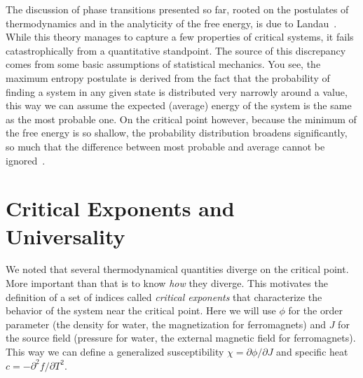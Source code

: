The discussion of phase transitions presented so far, rooted on the postulates
of thermodynamics and in the analyticity of the free energy, is due to
Landau~\cite{Landau1969}. While this theory manages to capture a few properties
of critical systems, it fails catastrophically from a quantitative standpoint.
The source of this discrepancy comes from some basic assumptions of statistical
mechanics. You see, the maximum entropy postulate is derived from the fact that
the probability of finding a system in any given state is distributed very
narrowly around a value, this way we can assume the expected (average) energy
of the system is the same as the most probable one. On the critical point
however, because the minimum of the free energy is so shallow, the probability
distribution broadens significantly, so much that the difference between most
probable and average cannot be ignored~\cite{Callen1985}.


\section{Critical Exponents and Universality}
\label{sec:universality}
\newcommand{\op}{\phi}
\newcommand{\sfi}{J}

We noted that several thermodynamical quantities diverge on the critical point.
More important than that is to know \textit{how} they diverge. This motivates
the definition of a set of indices called \textit{critical exponents} that
characterize the behavior of the system near the critical point. Here we will
use $\op$ for the order parameter (the density for water, the magnetization for
ferromagnets) and $\sfi$ for the source field (pressure for water, the external
magnetic field for ferromagnets). This way we can define a generalized
susceptibility $\chi=\partial\op/\partial \sfi$ and specific heat
$c=-\partial^2 f / \partial T^2$.

